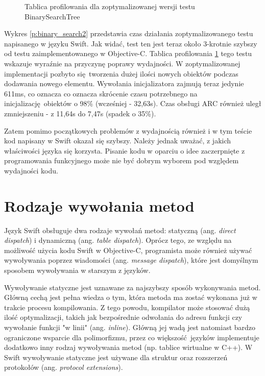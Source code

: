\documentclass[mgr, shortabstract]{iithesis}
\newcommand{\ang}[1]{ang. \textit{#1}}
\begin{document}
\begin{figure}
    \caption{Tablica profilowania dla zoptymalizowanej wersji testu BinarySearchTree}
    \label{i:binary_search2}
\end{figure}

Wykres \ref{p:binary_search2} przedstawia czas działania zoptymalizowanego testu napisanego w języku Swift. Jak widać, test ten jest teraz około 3-krotnie szybszy od testu zaimplementowanego w Objective-C. Tablica profilowania \ref{i:binary_search2} tego testu wskazuje wyraźnie na przyczynę poprawy wydajności. W zoptymalizowanej implementacji pozbyto się tworzenia dużej ilości nowych obiektów podczas dodawania nowego elementu. Wywołania inicjalizatora zajmują teraz jedynie 611ms, co oznacza co oznacza skrócenie czasu potrzebnego na inicjalizację obiektów o 98\% (wcześniej - 32,63s). Czas obsługi ARC również uległ zmniejszeniu - z 11,64s do 7,47s (spadek o 35\%). 

Zatem pomimo początkowych problemów z wydajnością również i w tym teście kod napisany w Swift okazał się szybszy. Należy jednak uważać, z jakich właściwości języka się korzysta. Pisanie kodu w oparciu o idee zaczerpnięte z programowania funkcyjnego może nie być dobrym wyborem pod względem wydajności kodu.

\section{Rodzaje wywołania metod}

Język Swift obsługuje dwa rodzaje wywołań metod: statyczną (\ang{direct dispatch}) i dynamiczną (\ang{table dispatch}). Oprócz tego, ze względu na możliwość użycia kodu Swift w Objective-C, programista może również używać wywoływania poprzez wiadomości (\ang{message dispatch}), które jest domyślnym sposobem wywoływania w starszym z języków.

Wywoływanie statyczne jest uznawane za najszybszy sposób wykonywania metod. Główną cechą jest pełna wiedza o tym, która metoda ma zostać wykonana już w trakcie procesu kompilowania. Z tego powodu, kompilator może stosować dużą ilość optymalizacji, takich jak bezpośrednie odwołania do adresu funkcji czy wywołanie funkcji "w linii" (\ang{inline}). Główną jej wadą jest natomiast bardzo ograniczone wsparcie dla polimorfizmu, przez co większość języków implementuje dodatkowo inny rodzaj wywoływania metod (np. tablice wirtualne w C++). W Swift wywoływanie statyczne jest używane dla struktur oraz rozszerzeń protokołów (\ang{protocol extensions}).
\end{document}
